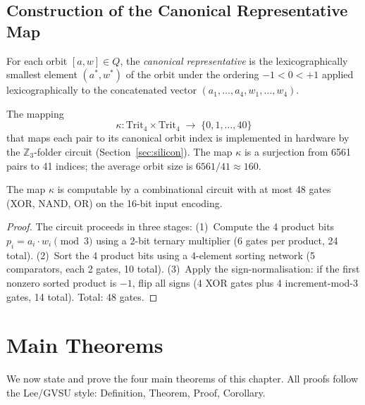 \subsection{Construction of the Canonical Representative Map}
\label{subsec:canonical}

\begin{definition}
\label{def:canonical}
For each orbit \([a,w] \in Q\), the \emph{canonical representative}
is the lexicographically smallest element \((a^*,w^*)\) of the orbit
under the ordering \(-1 < 0 < +1\) applied lexicographically to the
concatenated vector \((a_1,\ldots,a_4,w_1,\ldots,w_4)\).
\end{definition}

The mapping
\[
  \kappa \colon \mathrm{Trit}_4 \times \mathrm{Trit}_4
  \;\longrightarrow\; \{0, 1, \ldots, 40\}
\]
that maps each pair to its canonical orbit index is implemented in
hardware by the \(\mathbb{Z}_3\)-folder circuit (Section~\ref{sec:silicon}).
The map \(\kappa\) is a surjection from 6561 pairs to 41 indices; the
average orbit size is \(6561/41 \approx 160\).

\begin{proposition}
\label{prop:kappa_computable}
The map \(\kappa\) is computable by a combinational circuit with at most
48 gates (XOR, NAND, OR) on the 16-bit input encoding.
\end{proposition}

\begin{proof}
The circuit proceeds in three stages:
(1)~Compute the 4 product bits \(p_i = a_i \cdot w_i \pmod{3}\)
using a 2-bit ternary multiplier (6 gates per product, 24 total).
(2)~Sort the 4 product bits using a 4-element sorting network
(5 comparators, each 2 gates, 10 total).
(3)~Apply the sign-normalisation: if the first nonzero sorted product
is \(-1\), flip all signs (4 XOR gates plus 4 increment-mod-3 gates,
14 total).  Total: 48 gates.
\end{proof}

\section{Main Theorems}
\label{sec:theorems}

We now state and prove the four main theorems of this chapter.  All proofs
follow the Lee/GVSU style: Definition, Theorem, Proof, Corollary.

